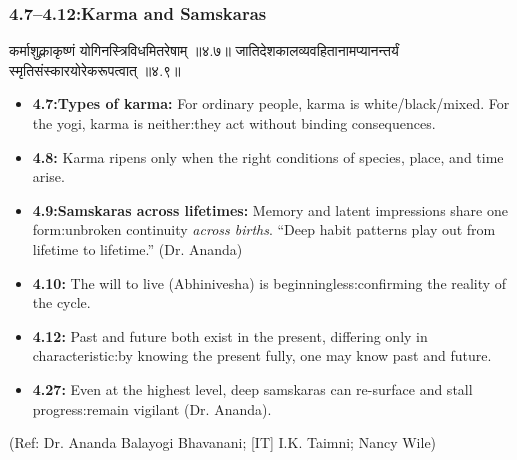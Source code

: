 \begin{frame}[fragile]\frametitle{4.7–4.12:Karma and Samskaras}

\begin{sanskrit}
कर्माशुक्लाकृष्णं योगिनस्त्रिविधमितरेषाम् ॥४.७॥
जातिदेशकालव्यवहितानामप्यानन्तर्यं स्मृतिसंस्कारयोरेकरूपत्वात् ॥४.९॥
\end{sanskrit}

\begin{itemize}
\item \textbf{4.7:Types of karma:} For ordinary people, karma is white/black/mixed. For the yogi, karma is neither:they act without binding consequences.
\item \textbf{4.8:} Karma ripens only when the right conditions of species, place, and time arise.
\item \textbf{4.9:Samskaras across lifetimes:} Memory and latent impressions share one form:unbroken continuity \emph{across births}. ``Deep habit patterns play out from lifetime to lifetime.'' (Dr. Ananda)
\item \textbf{4.10:} The will to live (Abhinivesha) is beginningless:confirming the reality of the cycle.
\item \textbf{4.12:} Past and future both exist in the present, differing only in characteristic:by knowing the present fully, one may know past and future.
\item \textbf{4.27:} Even at the highest level, deep samskaras can re-surface and stall progress:remain vigilant (Dr. Ananda).
\end{itemize}

\tiny{(Ref: Dr. Ananda Balayogi Bhavanani; [IT] I.K. Taimni; Nancy Wile)}

\end{frame}

